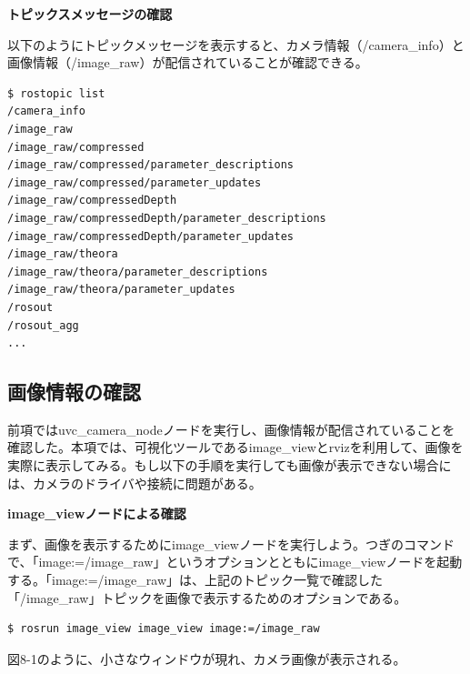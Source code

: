 \textbf{トピックスメッセージの確認}

以下のようにトピックメッセージを表示すると、カメラ情報（/camera\_info）と画像情報（/image\_raw）が配信されていることが確認できる。

\begin{lstlisting}[language=ROS]
$ rostopic list
/camera_info
/image_raw
/image_raw/compressed
/image_raw/compressed/parameter_descriptions /image_raw/compressed/parameter_updates
/image_raw/compressedDepth
/image_raw/compressedDepth/parameter_descriptions /image_raw/compressedDepth/parameter_updates
/image_raw/theora
/image_raw/theora/parameter_descriptions
/image_raw/theora/parameter_updates
/rosout
/rosout_agg
...
\end{lstlisting}

\subsection{画像情報の確認}

前項ではuvc\_camera\_nodeノードを実行し、画像情報が配信されていることを確認した。本項では、可視化ツールであるimage\_viewとrvizを利用して、画像を実際に表示してみる。もし以下の手順を実行しても画像が表示できない場合には、カメラのドライバや接続に問題がある。

\textbf{image\_viewノードによる確認}

まず、画像を表示するためにimage\_viewノードを実行しよう。つぎのコマンドで、「image:=/image\_raw」というオプションとともにimage\_viewノードを起動する。「image:=/image\_raw」は、上記のトピック一覧で確認した「/image\_raw」トピックを画像で表示するためのオプションである。

\begin{lstlisting}[language=ROS]
$ rosrun image_view image_view image:=/image_raw
\end{lstlisting}

図8-1のように、小さなウィンドウが現れ、カメラ画像が表示される。

